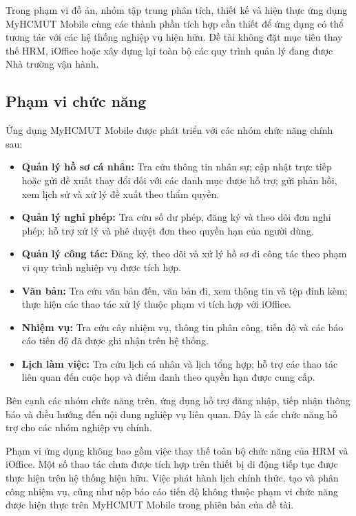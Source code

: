 Trong phạm vi đồ án, nhóm tập trung phân tích, thiết kế và hiện thực ứng dụng MyHCMUT Mobile cùng các thành phần tích hợp cần thiết để ứng dụng có thể tương tác với các hệ thống nghiệp vụ hiện hữu. Đề tài không đặt mục tiêu thay thế HRM, iOffice hoặc xây dựng lại toàn bộ các quy trình quản lý đang được Nhà trường vận hành.

\subsection{Phạm vi chức năng}
\label{subsec:phamvi_chucnang}

Ứng dụng MyHCMUT Mobile được phát triển với các nhóm chức năng chính sau:

\begin{itemize}
  \item \textbf{Quản lý hồ sơ cá nhân:} Tra cứu thông tin nhân sự; cập nhật trực tiếp hoặc gửi đề xuất thay đổi đối với các danh mục được hỗ trợ; gửi phản hồi, xem lịch sử và xử lý đề xuất theo thẩm quyền.
  \item \textbf{Quản lý nghỉ phép:} Tra cứu số dư phép, đăng ký và theo dõi đơn nghỉ phép; hỗ trợ xử lý và phê duyệt đơn theo quyền hạn của người dùng.
  \item \textbf{Quản lý công tác:} Đăng ký, theo dõi và xử lý hồ sơ đi công tác theo phạm vi quy trình nghiệp vụ được tích hợp.
  \item \textbf{Văn bản:} Tra cứu văn bản đến, văn bản đi, xem thông tin và tệp đính kèm; thực hiện các thao tác xử lý thuộc phạm vi tích hợp với iOffice.
  \item \textbf{Nhiệm vụ:} Tra cứu cây nhiệm vụ, thông tin phân công, tiến độ và các báo cáo tiến độ đã được ghi nhận trên hệ thống.
  \item \textbf{Lịch làm việc:} Tra cứu lịch cá nhân và lịch tổng hợp; hỗ trợ các thao tác liên quan đến cuộc họp và điểm danh theo quyền hạn được cung cấp.
\end{itemize}

Bên cạnh các nhóm chức năng trên, ứng dụng hỗ trợ đăng nhập, tiếp nhận thông báo và điều hướng đến nội dung nghiệp vụ liên quan. Đây là các chức năng hỗ trợ cho các nhóm nghiệp vụ chính.

Phạm vi ứng dụng không bao gồm việc thay thế toàn bộ chức năng của HRM và iOffice. Một số thao tác chưa được tích hợp trên thiết bị di động tiếp tục được thực hiện trên hệ thống hiện hữu. Việc phát hành lịch chính thức, tạo và phân công nhiệm vụ, cũng như nộp báo cáo tiến độ không thuộc phạm vi chức năng được hiện thực trên MyHCMUT Mobile trong phiên bản của đề tài.

